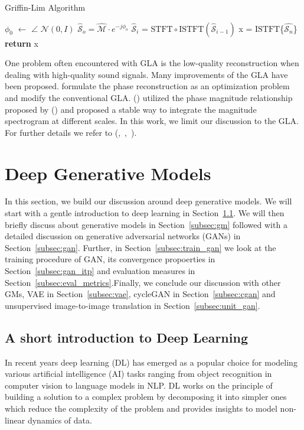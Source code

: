 \begin{algorithm}
\caption{Griffin-Lim Algorithm}
\label{alg:gla}
\begin{algorithmic}[1]
 
\State $\phi_0$ $\leftarrow$ $\angle$ $\mathcal{N}(0,I)$ 
\State $\hat{\mathcal{S}}_o = \mathcal{\hat{M}}\cdot e^{-j\phi_o}$ 
\State $\hat{\mathcal{S}}_i$ = $\text{STFT}\circ \text{ISTFT} (\hat{\mathcal{S}}_{i-1})$
\EndFor
\State x = $\text{ISTFT}$\{$\hat{\mathcal{S}_n}$\}
\State \textbf{return} x
\EndProcedure
\end{algorithmic}
\end{algorithm}

One problem often encountered with GLA is the low-quality reconstruction when dealing with high-quality sound signals. Many improvements of the GLA have been proposed. \citet{perraudin2013fast} formulate the phase reconstruction as an optimization problem and modify the conventional GLA. (\cite{pruuvsa2017noniterative}) utilized the phase magnitude relationship proposed by (\cite{auger2012phase}) and proposed a stable way to integrate the magnitude spectrogram at different scales. In this work, we limit our discussion to the GLA. For further details we refer to (\cite{perraudin2013fast},~\cite{le2010fast},~\cite{jaganathan2015phase}).

\section{Deep Generative Models}
\label{sec:dgm}
In this section, we build our discussion around deep generative models. We will start with a gentle introduction to deep learning in Section~\ref{subsec:dl}. We will then briefly discuss about generative models in Section~\ref{subsec:gm} followed with a detailed discussion on generative adversarial networks (GANs) in Section~\ref{subsec:gan}. Further, in Section~\ref{subsec:train_gan} we look at the training procedure of GAN, its convergence propoerties in Section~\ref{subsec:gan_itp} and evaluation measures in Section~\ref{subsec:eval_metrics}.Finally, we conclude our discussion with other GMs, VAE in Section~\ref{subsec:vae}, cycleGAN in Section~\ref{subsec:cgan} and unsupervised image-to-image translation in Section~\ref{subsec:unit_gan}. 
\subsection{A short introduction to Deep Learning}
\label{subsec:dl}
In recent years deep learning (DL) has emerged as a popular choice for modeling various artificial intelligence (AI) tasks ranging from object recognition in computer vision to language models in NLP. DL works on the principle of building a solution to a complex problem by decomposing it into simpler ones which reduce the complexity of the problem and provides insights to model non-linear dynamics of data. 

